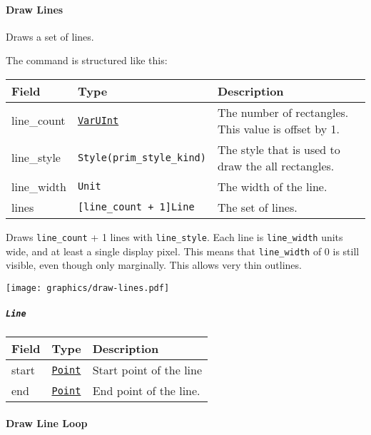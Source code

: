 \documentclass[]{article}
\begin{document}
\hypertarget{draw-lines}{\paragraph{Draw Lines}\label{draw-lines}}

Draws a set of lines.

The command is structured like this:

\begin{longtable}[]{@{}p{1in}p{2in}p{3in}@{}}
\toprule
Field & Type & Description \\
\midrule
\endhead
line\_count & \protect\hyperlink{varuint}{\texttt{VarUInt}} & The number of rectangles. This value is offset by 1. \\
line\_style & \texttt{Style(prim\_style\_kind)} & The style that is used to draw the all rectangles. \\
line\_width & \texttt{Unit} & The width of the line. \\
lines & \texttt{{[}line\_count\ +\ 1{]}Line} & The set of lines. \\
\bottomrule
\end{longtable}

Draws \texttt{line\_count} + 1 lines with \texttt{line\_style}. Each line is \texttt{line\_width} units wide, and at least a single display pixel. This means that \texttt{line\_width} of 0 is still visible, even though only marginally. This allows very thin outlines.

\begin{center}
  \texttt{[image: graphics/draw-lines.pdf]}
\end{center}

\hypertarget{line}{\subparagraph{\texorpdfstring{\texttt{Line}}{Line}}\label{line}}

\begin{longtable}[]{@{}p{1in}p{2in}p{3in}@{}}
\toprule
Field & Type & Description \\
\midrule
\endhead
start & \protect\hyperlink{point}{\texttt{Point}} & Start point of the line \\
end & \protect\hyperlink{point}{\texttt{Point}} & End point of the line. \\
\bottomrule
\end{longtable}

\hypertarget{draw-line-loop}{\paragraph{Draw Line Loop}\label{draw-line-loop}}
\end{document}
